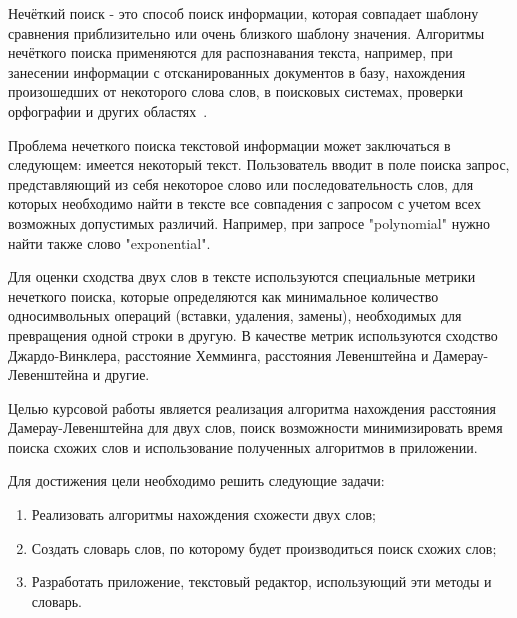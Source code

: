 \intro
Нечёткий поиск - это способ поиск информации, которая совпадает шаблону сравнения приблизительно или очень близкого шаблону значения. Алгоритмы нечёткого поиска применяются для распознавания текста, например, при занесении информации с отсканированных документов в базу, нахождения произошедших от некоторого слова слов, в поисковых системах, проверки орфографии и других областях~\cite{obzorMetodov}.

Проблема нечеткого поиска текстовой информации может заключаться в следующем: имеется некоторый текст. Пользователь вводит в поле поиска запрос, представляющий из себя некоторое слово или последовательность слов, для которых необходимо найти в тексте все совпадения с запросом с учетом всех возможных допустимых различий. Например, при запросе "polynomial" нужно найти также слово "exponential".

Для оценки сходства двух слов в тексте используются специальные метрики нечеткого поиска, которые определяются как минимальное количество односимвольных операций (вставки, удаления, замены), необходимых для превращения одной строки в другую. В качестве метрик используются сходство Джардо-Винклера, расстояние Хемминга, расстояния Левенштейна и Дамерау-Левенштейна и другие.

Целью курсовой работы является реализация алгоритма нахождения расстояния Дамерау-Левенштейна для двух слов, поиск возможности минимизировать время поиска схожих слов и использование полученных алгоритмов в приложении.

Для достижения цели необходимо решить следующие задачи:

\begin{enumerate}
  \item Реализовать алгоритмы нахождения схожести двух слов;
  \item Создать словарь слов, по которому будет производиться поиск схожих слов;
  \item Разработать приложение, текстовый редактор, использующий эти методы и словарь.
\end{enumerate}